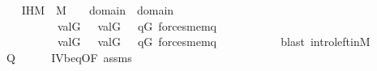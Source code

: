 \begin{isabellebody}
\ \ \isamarkupfalse%
\ IH{\isacharprime}{\kern0pt}{\isacharcolon}{\kern0pt}{\isachardoublequoteopen}{\isasymtau}{\isasymin}M\ {\isasymLongrightarrow}\ {\isasymtheta}{\isasymin}M\ {\isasymLongrightarrow}\ {\isasymsigma}\ {\isasymin}\ domain{\isacharparenleft}{\kern0pt}{\isasymtau}{\isacharparenright}{\kern0pt}\ {\isasymunion}\ domain{\isacharparenleft}{\kern0pt}{\isasymtheta}{\isacharparenright}{\kern0pt}\ {\isasymLongrightarrow}\isanewline
\ \ \ \ \ \ \ \ \ \ {\isacharparenleft}{\kern0pt}val{\isacharparenleft}{\kern0pt}G{\isacharcomma}{\kern0pt}\ {\isasymsigma}{\isacharparenright}{\kern0pt}\ {\isasymin}\ val{\isacharparenleft}{\kern0pt}G{\isacharcomma}{\kern0pt}\ {\isasymtau}{\isacharparenright}{\kern0pt}\ {\isasymlongrightarrow}\ {\isacharparenleft}{\kern0pt}{\isasymexists}q{\isasymin}G{\isachardot}{\kern0pt}\ forces{\isacharunderscore}{\kern0pt}mem{\isacharparenleft}{\kern0pt}q{\isacharcomma}{\kern0pt}\ {\isasymsigma}{\isacharcomma}{\kern0pt}\ {\isasymtau}{\isacharparenright}{\kern0pt}{\isacharparenright}{\kern0pt}{\isacharparenright}{\kern0pt}\ {\isasymand}\isanewline
\ \ \ \ \ \ \ \ \ \ {\isacharparenleft}{\kern0pt}val{\isacharparenleft}{\kern0pt}G{\isacharcomma}{\kern0pt}\ {\isasymsigma}{\isacharparenright}{\kern0pt}\ {\isasymin}\ val{\isacharparenleft}{\kern0pt}G{\isacharcomma}{\kern0pt}\ {\isasymtheta}{\isacharparenright}{\kern0pt}\ {\isasymlongrightarrow}\ {\isacharparenleft}{\kern0pt}{\isasymexists}q{\isasymin}G{\isachardot}{\kern0pt}\ forces{\isacharunderscore}{\kern0pt}mem{\isacharparenleft}{\kern0pt}q{\isacharcomma}{\kern0pt}\ {\isasymsigma}{\isacharcomma}{\kern0pt}\ {\isasymtheta}{\isacharparenright}{\kern0pt}{\isacharparenright}{\kern0pt}{\isacharparenright}{\kern0pt}{\isachardoublequoteclose}\ \ {\isasymsigma}\ \isanewline
\ \ \ \ \isamarkupfalse%
\ {\isacharparenleft}{\kern0pt}blast\ intro{\isacharcolon}{\kern0pt}left{\isacharunderscore}{\kern0pt}in{\isacharunderscore}{\kern0pt}M{\isacharparenright}{\kern0pt}\ \isanewline
\ \ \isamarkupfalse%
\isanewline
\ \ \isamarkupfalse%
\ {\isachardoublequoteopen}{\isacharquery}{\kern0pt}Q{\isacharparenleft}{\kern0pt}{\isasymtau}{\isacharcomma}{\kern0pt}{\isasymtheta}{\isacharparenright}{\kern0pt}{\isachardoublequoteclose}\isanewline
\ \ \ \ \isamarkupfalse%
\ IV{}{}{}b{\isacharunderscore}{\kern0pt}eq{\isacharbrackleft}{\kern0pt}OF\ assms{\isacharparenleft}{\kern0pt}{}{\isacharparenright}{\kern0pt}{\isacharbrackright}{\kern0pt}\ \isamarkupfalse%

\end{isabellebody}
